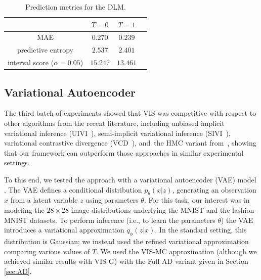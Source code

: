 \begin{table}[!h]
\centering
\caption{Prediction metrics for the DLM.}\label{tbl:preds_dlm}
\begin{tabular}{c@{\hskip 1.1in}c@{\hskip 1in}c@{\hskip 1in}c}
\toprule
   & ${T=0}$                             & ${T=1}$   \\ 
 \midrule
    MAE          & $0.270$ &  $0.239$ \\

    predictive entropy          & $2.537$ &  $2.401$ \\
    interval score ($\alpha=0.05$) & $15.247$ & $13.461$\\
 \bottomrule
\end{tabular}
\end{table}

\subsection{Variational Autoencoder}

The third batch of experiments showed that VIS 
was competitive with respect to other algorithms from the recent literature, including unbiased implicit variational inference (UIVI~\cite{pmlr-v89-titsias19a}), semi-implicit variational inference (SIVI~\cite{yin2018semi}),  variational contrastive divergence (VCD~\cite{pmlr-v97-ruiz19a}), 
and~the HMC variant from~\cite{hoffman2017learning}, showing that our framework can outperform those approaches in similar experimental settings. 

 To this end, we tested the approach with a variational autoencoder (VAE) model \cite{kingma2013auto}. %
The VAE defines a conditional distribution $p_{\theta}(x | z)$, generating an observation $x$ from a latent variable $z$ using {parameters $\theta$}. For this task, our interest 
was in modeling the $28 \times 28$ image distributions 
underlying the MNIST %
\cite{lecun-mnisthandwrittendigit-2010} and the fashion-MNIST \cite{xiao2017/online} datasets. To perform inference (i.e., to learn
the parameters $\theta$) the VAE introduces a variational approximation $q_{\phi}(z | x)$. In the standard setting, this distribution is Gaussian; we instead used the refined variational approximation comparing various values of $T$. We used the VIS-MC approximation (although we achieved similar results
with VIS-G) with the Full AD variant given in Section \ref{sec:AD}.

